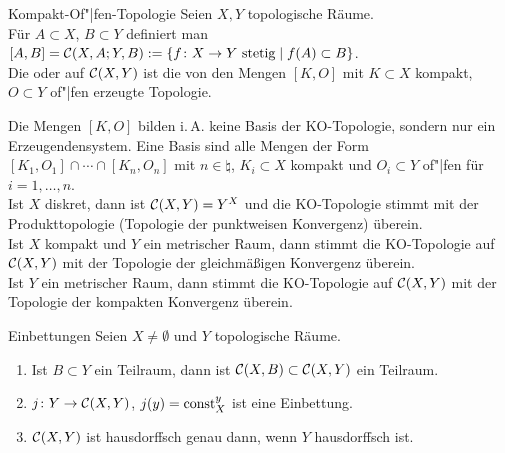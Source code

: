 \linie

\begin{Def}{Kompakt-Of"|fen-Topologie}
    Seien $X, Y$ topologische Räume. \\
    Für $A \subset X$, $B \subset Y$ definiert man
    $[A, B] = \mathcal{C}(X, A; Y, B) := \{f\colon X \rightarrow Y \text{ stetig} \;|\;
    f(A) \subset B\}$. \\
    Die  oder 
    auf $\mathcal{C}(X, Y)$ ist die von
    den Mengen $[K, O]$ mit $K \subset X$ kompakt, $O \subset Y$ of"|fen
    erzeugte Topologie.
\end{Def}

\begin{Bem}
    Die Mengen $[K, O]$ bilden i.\,A. keine Basis der KO-Topologie, sondern
    nur ein Erzeugendensystem.
    Eine Basis sind alle Mengen der Form
    $[K_1, O_1] \cap \dotsb \cap [K_n, O_n]$
    mit $n \in \natural$, $K_i \subset X$ kompakt und $O_i \subset Y$ of"|fen
    für $i = 1, \dotsc, n$. \\
    Ist $X$ diskret, dann ist $\mathcal{C}(X, Y) = Y^X$ und die KO-Topologie
    stimmt mit der Produkttopologie (Topologie der punktweisen Konvergenz)
    überein. \\
    Ist $X$ kompakt und $Y$ ein metrischer Raum, dann stimmt die
    KO-Topologie auf $\mathcal{C}(X, Y)$ mit der
    Topologie der gleichmäßigen Konvergenz überein. \\
    Ist $Y$ ein metrischer Raum, dann stimmt die
    KO-Topologie auf $\mathcal{C}(X, Y)$ mit der
    Topologie der kompakten Konvergenz überein.
\end{Bem}

\linie

\begin{Satz}{Einbettungen}
    Seien $X \not= \emptyset$ und $Y$ topologische Räume.
    \begin{enumerate}
        \item
        Ist $B \subset Y$ ein Teilraum, dann ist
        $\mathcal{C}(X, B) \subset \mathcal{C}(X, Y)$ ein Teilraum.

        \item
        $j\colon Y \rightarrow \mathcal{C}(X, Y)$, $j(y) = \operatorname{const}_X^y$ ist eine
        Einbettung.

        \item
        $\mathcal{C}(X, Y)$ ist hausdorffsch genau dann, wenn $Y$ hausdorffsch ist.
    \end{enumerate}
\end{Satz}

